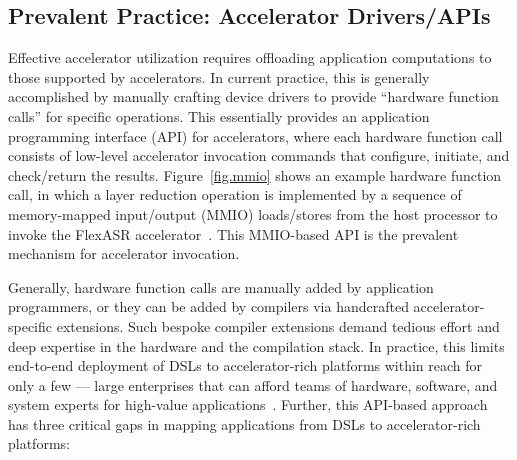 %


\subsection{Prevalent Practice: Accelerator Drivers/APIs}
%
Effective accelerator utilization requires offloading application computations to those supported by accelerators. 
%
In current practice, this is generally accomplished by manually crafting device drivers to provide ``hardware function calls'' for specific operations.
%
This essentially provides an application programming interface (API) for accelerators, where each hardware function call consists of low-level accelerator invocation commands that configure, initiate, and check/return the results. 
%
Figure~\ref{fig.mmio} shows an example hardware function call, in which a layer reduction operation is implemented by a sequence of memory-mapped input/output (MMIO) loads/stores from the host processor to invoke the FlexASR accelerator~\cite{tambe20219}.
This MMIO-based API is the prevalent mechanism for accelerator invocation.



Generally, hardware function calls are manually added
by application programmers, or %
they can be  %
added by compilers via handcrafted accelerator-specific extensions. Such bespoke compiler extensions demand tedious effort and deep expertise in the hardware and the compilation stack.%
%
In practice, this limits end-to-end deployment of DSLs to accelerator-rich platforms within reach for only a few --- large enterprises that can afford teams of hardware, software, and system experts for high-value applications~\cite{caulfield2016cloud,fowers2018configurable,jouppi2017datacenter}.
Further, this API-based approach has three critical gaps in mapping applications from DSLs to accelerator-rich platforms:

